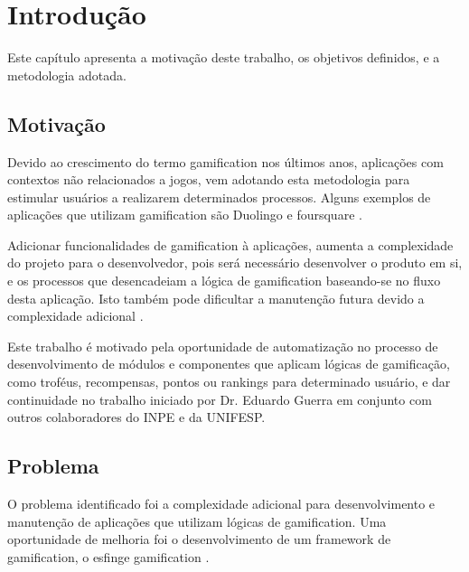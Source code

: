 \chapter[Introdução]{Introdução}
\par Este capítulo apresenta a motivação deste trabalho, os objetivos definidos, e a metodologia adotada.

\section{Motivação}

\par Devido ao crescimento do termo gamification nos últimos anos, \cite{groh2012gamification} aplicações com contextos não relacionados a jogos, vem adotando esta metodologia para estimular usuários a realizarem determinados processos. Alguns exemplos de aplicações que utilizam gamification são Duolingo \cite{melo2016eficiencia} e foursquare \cite{huotari2012defining}.

\par Adicionar funcionalidades de gamification à aplicações, aumenta a complexidade do projeto para o desenvolvedor, pois será necessário desenvolver o produto em si, e os processos que desencadeiam a lógica de gamification baseando-se no fluxo desta aplicação. Isto também pode dificultar a manutenção futura devido a complexidade adicional \cite{guerra2017approach}.

\par Este trabalho é motivado pela oportunidade de automatização no processo de desenvolvimento de módulos e componentes que aplicam lógicas de gamificação, como troféus, recompensas, pontos ou rankings para determinado usuário, e dar continuidade no trabalho iniciado por Dr. Eduardo Guerra em conjunto com outros colaboradores do INPE e da UNIFESP.

\section{Problema}

\par O problema identificado foi a complexidade adicional para desenvolvimento e manutenção de aplicações que utilizam lógicas de gamification. Uma oportunidade de melhoria foi o desenvolvimento de um framework de gamification, o esfinge gamification \cite{guerra2017approach}.

